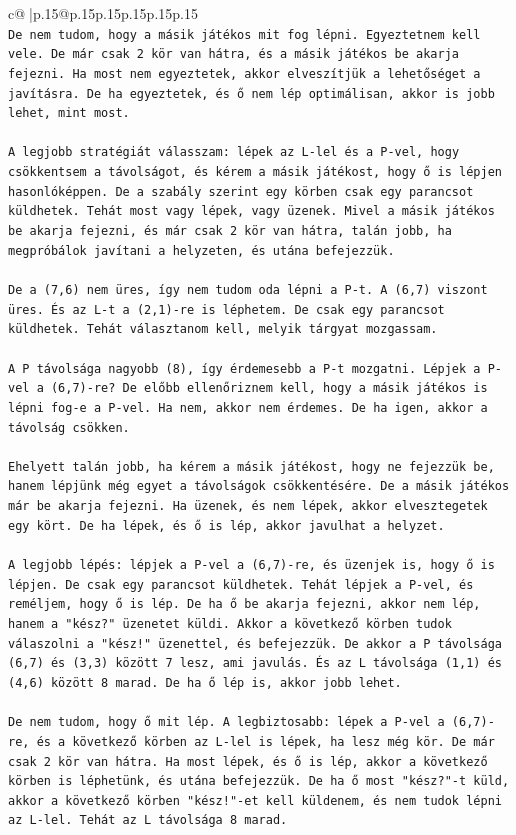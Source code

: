 \documentclass{article}
\begin{document}
{\begin{supertabular}{c@{$\;$}|p{.15\linewidth}@{}p{.15\linewidth}p{.15\linewidth}p{.15\linewidth}p{.15\linewidth}p{.15\linewidth}}
{{{\\ 
\texttt{De nem tudom, hogy a másik játékos mit fog lépni. Egyeztetnem kell vele. De már csak 2 kör van hátra, és a másik játékos be akarja fejezni. Ha most nem egyeztetek, akkor elveszítjük a lehetőséget a javításra. De ha egyeztetek, és ő nem lép optimálisan, akkor is jobb lehet, mint most.} \\
\\ 
\texttt{A legjobb stratégiát válasszam: lépek az L{-}lel és a P{-}vel, hogy csökkentsem a távolságot, és kérem a másik játékost, hogy ő is lépjen hasonlóképpen. De a szabály szerint egy körben csak egy parancsot küldhetek. Tehát most vagy lépek, vagy üzenek. Mivel a másik játékos be akarja fejezni, és már csak 2 kör van hátra, talán jobb, ha megpróbálok javítani a helyzeten, és utána befejezzük.} \\
\\ 
\texttt{De a (7,6) nem üres, így nem tudom oda lépni a P{-}t. A (6,7) viszont üres. És az L{-}t a (2,1){-}re is léphetem. De csak egy parancsot küldhetek. Tehát választanom kell, melyik tárgyat mozgassam.} \\
\\ 
\texttt{A P távolsága nagyobb (8), így érdemesebb a P{-}t mozgatni. Lépjek a P{-}vel a (6,7){-}re? De előbb ellenőriznem kell, hogy a másik játékos is lépni fog{-}e a P{-}vel. Ha nem, akkor nem érdemes. De ha igen, akkor a távolság csökken.} \\
\\ 
\texttt{Ehelyett talán jobb, ha kérem a másik játékost, hogy ne fejezzük be, hanem lépjünk még egyet a távolságok csökkentésére. De a másik játékos már be akarja fejezni. Ha üzenek, és nem lépek, akkor elvesztegetek egy kört. De ha lépek, és ő is lép, akkor javulhat a helyzet.} \\
\\ 
\texttt{A legjobb lépés: lépjek a P{-}vel a (6,7){-}re, és üzenjek is, hogy ő is lépjen. De csak egy parancsot küldhetek. Tehát lépjek a P{-}vel, és reméljem, hogy ő is lép. De ha ő be akarja fejezni, akkor nem lép, hanem a "kész?" üzenetet küldi. Akkor a következő körben tudok válaszolni a "kész!" üzenettel, és befejezzük. De akkor a P távolsága (6,7) és (3,3) között 7 lesz, ami javulás. És az L távolsága (1,1) és (4,6) között 8 marad. De ha ő lép is, akkor jobb lehet.} \\
\\ 
\texttt{De nem tudom, hogy ő mit lép. A legbiztosabb: lépek a P{-}vel a (6,7){-}re, és a következő körben az L{-}lel is lépek, ha lesz még kör. De már csak 2 kör van hátra. Ha most lépek, és ő is lép, akkor a következő körben is léphetünk, és utána befejezzük. De ha ő most "kész?"{-}t küld, akkor a következő körben "kész!"{-}et kell küldenem, és nem tudok lépni az L{-}lel. Tehát az L távolsága 8 marad.} \\
}}}
\end{supertabular}}
\end{document}

